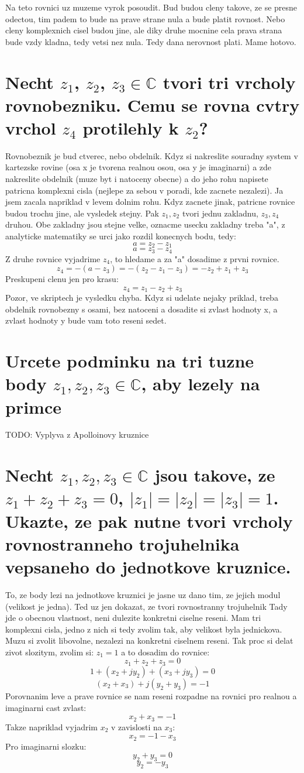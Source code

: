Na teto rovnici uz muzeme vyrok posoudit. Bud budou cleny takove, ze se presne odectou, tim padem to bude na prave strane nula a bude platit rovnost. Nebo cleny komplexnich cisel budou jine, ale diky druhe mocnine cela prava strana bude vzdy kladna, tedy vetsi nez nula. Tedy dana nerovnost plati. Mame hotovo.

\section{Necht $z_1$, $z_2$, $z_3 \in \mathbb{C}$ tvori tri vrcholy rovnobezniku. Cemu se rovna cvtry vrchol $z_4$ protilehly k $z_2$?}

Rovnobeznik je bud ctverec, nebo obdelnik. Kdyz si nakreslite souradny system v kartezske rovine (osa x je tvorena realnou osou, osa y je imaginarni) a zde nakreslite obdelnik (muze byt i natoceny obecne) a do jeho rohu napisete patricna komplexni cisla (nejlepe za sebou v poradi, kde zacnete nezalezi). Ja jsem zacala napriklad v levem dolnim rohu. Kdyz zacnete jinak, patricne rovnice budou trochu jine, ale vysledek stejny. Pak $z_1, z_2$ tvori jednu zakladnu, $z_3, z_4$ druhou. Obe zakladny jsou stejne velke, oznacme usecku zakladny treba "a", z analyticke matematiky se urci jako rozdil konecnych bodu, tedy:
$$a=z_2 - z_1$$
$$a=z_3 - z_4$$
Z druhe rovnice vyjadrime $z_4$, to hledame a za "a" dosadime z prvni rovnice.
$$z_4 = -(a - z_3) = -(z_2-z_1 -z_3) = -z_2 + z_1 + z_3 $$
Preskupeni clenu jen pro krasu:
$$z_4 = z_1 - z_2 + z_3$$
Pozor, ve skriptech je vysledku chyba. Kdyz si udelate nejaky priklad, treba obdelnik rovnobezny s osami, bez natoceni a dosadite si zvlast hodnoty x, a zvlast hodnoty y bude vam toto reseni sedet.

\section{Urcete podminku na tri tuzne body $z_1, z_2, z_3 \in \mathbb{C}$, aby lezely na primce}

TODO: Vyplyva z Apolloinovy kruznice

\section{Necht $z_1, z_2, z_3 \in \mathbb{C}$ jsou takove, ze $z_1 +z_2 +z_3 = 0$, $|z_1|=|z_2|=|z_3| =1$. Ukazte, ze pak nutne tvori vrcholy rovnostranneho trojuhelnika vepsaneho do jednotkove kruznice.}

To, ze body lezi na jednotkove kruznici je jasne uz dano tim, ze jejich modul (velikost je jedna). Ted uz jen dokazat, ze tvori rovnostranny trojuhelnik Tady jde o obecnou vlastnost, neni dulezite konkretni ciselne reseni. Mam tri komplexni cisla, jedno z nich si tedy zvolim tak, aby velikost byla jednickova. Muzu si zvolit libovolne, nezalezi na konkretni ciselnem reseni. Tak proc si delat zivot slozitym, zvolim si:
$z_1 = 1$ a to dosadim do rovnice:
$$z_1 +z_2 +z_3 = 0$$
$$1 + (x_2 + j y_2) + (x_3 +jy_3) = 0$$
$$(x_2+x_3) +j(y_2 + y_3) = -1$$
Porovnanim leve a prave rovnice se nam reseni rozpadne na rovnici pro realnou a imaginarni cast zvlast:
$$x_2+x_3 = -1$$
Takze napriklad vyjadrim $x_2$ v zavislosti na $x_3$:
$$x_2 = -1 - x_3$$
Pro imaginarni slozku:
$$y_2+y_3 = 0$$
$$y_2 = - y_3$$


